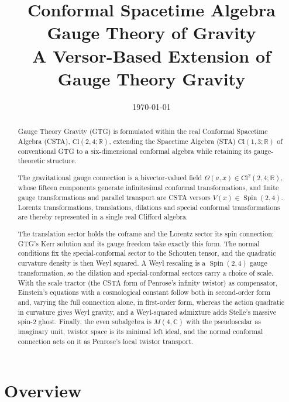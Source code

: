\documentclass[11pt,a4paper]{article}
\title{
    \textbf{Conformal Spacetime Algebra Gauge Theory of Gravity}\\
    \large A Versor-Based Extension of Gauge Theory Gravity
}
\author{}
\date{\today}
\newcommand{\Cl}{\mathrm{Cl}}
\newcommand{\R}{\mathbb{R}}
\newcommand{\C}{\mathbb{C}}
\newcommand{\Spin}{\operatorname{Spin}}
\newcommand{\Om}{\Omega}
\begin{document}
\maketitle

\begin{abstract}

Gauge Theory Gravity (GTG) is formulated within the real
Conformal Spacetime Algebra (CSTA), \(\Cl(2,4;\R)\), extending the
Spacetime Algebra (STA) \(\Cl(1,3;\R)\) of conventional GTG to a
six-dimensional conformal algebra while retaining its gauge-theoretic
structure.

The gravitational gauge connection is a bivector-valued field
\(\Om(a,x)\in\Cl^2(2,4;\R)\), whose fifteen components generate
infinitesimal conformal transformations, and finite gauge
transformations and parallel transport are CSTA versors
\(V(x)\in\Spin(2,4)\). Lorentz transformations, translations,
dilations and special conformal transformations are thereby
represented in a single real Clifford algebra.

The translation sector holds the coframe
and the Lorentz sector its spin connection; GTG's Kerr solution and
its gauge freedom take exactly this form. The normal conditions fix
the special-conformal sector to the Schouten tensor, and the
quadratic curvature density is then Weyl squared. A Weyl rescaling is
a \(\Spin(2,4)\) gauge transformation, so the dilation and
special-conformal sectors carry a choice of scale. With the scale
tractor (the CSTA form of Penrose's infinity twistor) as compensator,
Einstein's equations with a cosmological constant follow both in
second-order form and, varying the full connection alone, in
first-order form, whereas the action quadratic in curvature gives
Weyl gravity, and a Weyl-squared admixture adds Stelle's massive
spin-2 ghost. Finally, the even subalgebra is \(M(4,\C)\) with the
pseudoscalar as imaginary unit, twistor space is its minimal left
ideal, and the normal conformal connection acts on it as Penrose's
local twistor transport.

\end{abstract}

\tableofcontents

\newpage

\section{Overview}
\end{document}
